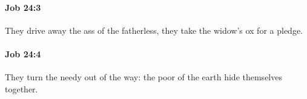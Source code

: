		\paragraph{Job 24:3} %
			\label{JOB-24-3}

			They drive away the ass of the fatherless, they take the widow’s ox for a pledge.


		\paragraph{Job 24:4} %
			\label{JOB-24-4}

			They turn the needy out of the way: the poor of the earth hide themselves together.


